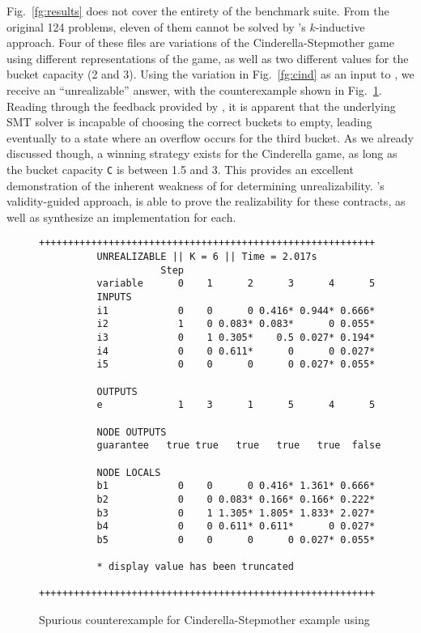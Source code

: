Fig.~\ref{fg:results} does not cover the entirety of the
benchmark suite. From the original 124 problems, eleven of them cannot be
solved by \jsyn's $k$-inductive approach.
Four of these files are variations of
the Cinderella-Stepmother game using different representations of the game, as well as two different values
for the bucket capacity (2 and 3). Using the variation in Fig.~\ref{fg:cind} as an input to \jsyn, we receive an ``unrealizable'' answer, with the counterexample shown
in Fig.~\ref{fg:cex}. Reading through the feedback provided by \jsyn, it is
apparent that the underlying SMT solver is incapable of choosing the correct
buckets to empty, leading eventually to a state where an overflow occurs for the
third bucket. As we already discussed though, a winning strategy exists for the
Cinderella game, as long as the bucket capacity \texttt{C} is between 1.5 and 3. This
provides an excellent demonstration of the inherent weakness of \jsyn
for determining unrealizability. \jsynvg's validity-guided approach,
is able to prove the realizability for these contracts, as
well as synthesize an implementation for each.

\begin{figure}[!t]
\centering
 \begin{Verbatim}[fontsize=\scriptsize]
	 ++++++++++++++++++++++++++++++++++++++++++++++++++++++++++
	      UNREALIZABLE || K = 6 || Time = 2.017s
	                 Step
	      variable      0    1      2      3      4      5
	      INPUTS
	      i1            0    0      0 0.416* 0.944* 0.666*
	      i2            1    0 0.083* 0.083*      0 0.055*
	      i3            0    1 0.305*    0.5 0.027* 0.194*
	      i4            0    0 0.611*      0      0 0.027*
	      i5            0    0      0      0 0.027* 0.055*
	
	      OUTPUTS
	      e             1    3      1      5      4      5
	
	      NODE OUTPUTS
	      guarantee   true true   true   true   true  false
	
	      NODE LOCALS
	      b1            0    0      0 0.416* 1.361* 0.666*
	      b2            0    0 0.083* 0.166* 0.166* 0.222*
	      b3            0    1 1.305* 1.805* 1.833* 2.027*
	      b4            0    0 0.611* 0.611*      0 0.027*
	      b5            0    0      0      0 0.027* 0.055*
	
	      * display value has been truncated
	 ++++++++++++++++++++++++++++++++++++++++++++++++++++++++++
 \end{Verbatim}
\vspace{-1.5em}
\caption{Spurious counterexample for Cinderella-Stepmother example using \jsyn}
\label{fg:cex}
\end{figure}


